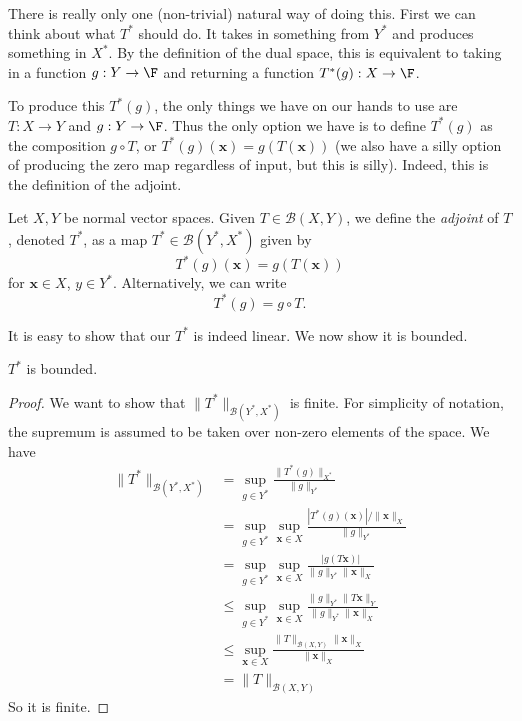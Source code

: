 \documentclass[a4paper]{article}
\begin{document}
There is really only one (non-trivial) natural way of doing this. First we can think about what $T^*$ should do. It takes in something from $Y^*$ and produces something in $X^*$. By the definition of the dual space, this is equivalent to taking in a function $g: Y \to \F$ and returning a function $T^*(g): X\to \F$.

To produce this $T^*(g)$, the only things we have on our hands to use are $T: X\to Y$ and $g: Y\to \F$. Thus the only option we have is to define $T^*(g)$ as the composition $g\circ T$, or $T^*(g)(\mathbf{x}) = g(T(\mathbf{x}))$ (we also have a silly option of producing the zero map regardless of input, but this is silly). Indeed, this is the definition of the adjoint.

\begin{defi}[Adjoint]
  Let $X, Y$ be normal vector spaces. Given $T\in \mathcal{B}(X, Y)$, we define the \emph{adjoint} of $T$, denoted $T^*$, as a map $T^*\in \mathcal{B}(Y^*, X^*)$ given by
  \[
    T^*(g)(\mathbf{x}) = g(T(\mathbf{x}))
  \]
  for $\mathbf{x} \in X$, $y\in Y^*$. Alternatively, we can write
  \[
    T^*(g) = g\circ T.
  \]
\end{defi}
It is easy to show that our $T^*$ is indeed linear. We now show it is bounded.

\begin{prop}
  $T^*$ is bounded.
\end{prop}

\begin{proof}
  We want to show that $\|T^*\|_{\mathcal{B}(Y^*, X^*)}$ is finite. For simplicity of notation, the supremum is assumed to be taken over non-zero elements of the space. We have
  \begin{align*}
    \|T^*\|_{\mathcal{B}(Y^*, X^*)} &= \sup_{g\in Y^*}\frac{\|T^*(g)\|_{X^*}}{\|g\|_{Y^*}}\\
    &= \sup_{g\in Y^*}\sup_{\mathbf{x}\in X}\frac{|T^*(g)(\mathbf{x})|/\|\mathbf{x}\|_X}{\|g\|_{Y^*}}\\
    &= \sup_{g\in Y^*}\sup_{\mathbf{x}\in X} \frac{|g(T\mathbf{x})|}{\|g\|_{Y^*}\|\mathbf{x}\|_X}\\
    &\leq \sup_{g\in Y^*}\sup_{\mathbf{x}\in X} \frac{\|g\|_{Y^*}\|T\mathbf{x}\|_Y}{\|g\|_{Y^*}\|\mathbf{x}\|_X}\\
    &\leq \sup_{\mathbf{x}\in X} \frac{\|T\|_{\mathcal{B}(X, Y)}\|\mathbf{x}\|_X}{\|\mathbf{x}\|_X}\\
    &= \|T\|_{\mathcal{B}(X, Y)}
  \end{align*}
  So it is finite.
\end{proof}
\end{document}
